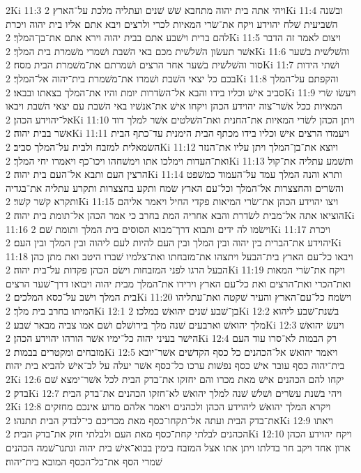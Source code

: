 2Ki 11:3  ויהי אתה בית יהוה מתחבא שׁשׁ שׁנים ועתליה מלכת על־הארץ׃
2Ki 11:4  ובשׁנה השׁביעית שׁלח יהוידע ויקח את־שׂרי המאיות לכרי ולרצים ויבא אתם אליו בית יהוה ויכרת להם ברית וישׁבע אתם בבית יהוה וירא אתם את־בן־המלך׃
2Ki 11:5  ויצום לאמר זה הדבר אשׁר תעשׂון השׁלשׁית מכם באי השׁבת ושׁמרי משׁמרת בית המלך׃
2Ki 11:6  והשׁלשׁית בשׁער סור והשׁלשׁית בשׁער אחר הרצים ושׁמרתם את־משׁמרת הבית מסח׃
2Ki 11:7  ושׁתי הידות בכם כל יצאי השׁבת ושׁמרו את־משׁמרת בית־יהוה אל־המלך׃
2Ki 11:8  והקפתם על־המלך סביב אישׁ וכליו בידו והבא אל־השׂדרות יומת והיו את־המלך בצאתו ובבאו׃
2Ki 11:9  ויעשׂו שׂרי המאיות ככל אשׁר־צוה יהוידע הכהן ויקחו אישׁ את־אנשׁיו באי השׁבת עם יצאי השׁבת ויבאו אל־יהוידע הכהן׃
2Ki 11:10  ויתן הכהן לשׂרי המאיות את־החנית ואת־השׁלטים אשׁר למלך דוד אשׁר בבית יהוה׃
2Ki 11:11  ויעמדו הרצים אישׁ וכליו בידו מכתף הבית הימנית עד־כתף הבית השׂמאלית למזבח ולבית על־המלך סביב׃
2Ki 11:12  ויוצא את־בן־המלך ויתן עליו את־הנזר ואת־העדות וימלכו אתו וימשׁחהו ויכו־כף ויאמרו יחי המלך׃
2Ki 11:13  ותשׁמע עתליה את־קול הרצין העם ותבא אל־העם בית יהוה׃
2Ki 11:14  ותרא והנה המלך עמד על־העמוד כמשׁפט והשׂרים והחצצרות אל־המלך וכל־עם הארץ שׂמח ותקע בחצצרות ותקרע עתליה את־בגדיה ותקרא קשׁר קשׁר׃
2Ki 11:15  ויצו יהוידע הכהן את־שׂרי המיאות פקדי החיל ויאמר אליהם הוציאו אתה אל־מבית לשׂדרת והבא אחריה המת בחרב כי אמר הכהן אל־תומת בית יהוה׃
2Ki 11:16  וישׂמו לה ידים ותבוא דרך־מבוא הסוסים בית המלך ותומת שׁם׃
2Ki 11:17  ויכרת יהוידע את־הברית בין יהוה ובין המלך ובין העם להיות לעם ליהוה ובין המלך ובין העם׃
2Ki 11:18  ויבאו כל־עם הארץ בית־הבעל ויתצהו את־מזבחתו ואת־צלמיו שׁברו היטב ואת מתן כהן הבעל הרגו לפני המזבחות וישׂם הכהן פקדות על־בית יהוה׃
2Ki 11:19  ויקח את־שׂרי המאות ואת־הכרי ואת־הרצים ואת כל־עם הארץ וירידו את־המלך מבית יהוה ויבואו דרך־שׁער הרצים בית המלך וישׁב על־כסא המלכים׃
2Ki 11:20  וישׂמח כל־עם־הארץ והעיר שׁקטה ואת־עתליהו המיתו בחרב בית מלך׃
2Ki 12:1  בן־שׁבע שׁנים יהואשׁ במלכו׃
2Ki 12:2  בשׁנת־שׁבע ליהוא מלך יהואשׁ וארבעים שׁנה מלך בירושׁלם ושׁם אמו צביה מבאר שׁבע׃
2Ki 12:3  ויעשׂ יהואשׁ הישׁר בעיני יהוה כל־ימיו אשׁר הורהו יהוידע הכהן׃
2Ki 12:4  רק הבמות לא־סרו עוד העם מזבחים ומקטרים בבמות׃
2Ki 12:5  ויאמר יהואשׁ אל־הכהנים כל כסף הקדשׁים אשׁר־יובא בית־יהוה כסף עובר אישׁ כסף נפשׁות ערכו כל־כסף אשׁר יעלה על לב־אישׁ להביא בית יהוה׃
2Ki 12:6  יקחו להם הכהנים אישׁ מאת מכרו והם יחזקו את־בדק הבית לכל אשׁר־ימצא שׁם בדק׃
2Ki 12:7  ויהי בשׁנת עשׂרים ושׁלשׁ שׁנה למלך יהואשׁ לא־חזקו הכהנים את־בדק הבית׃
2Ki 12:8  ויקרא המלך יהואשׁ ליהוידע הכהן ולכהנים ויאמר אלהם מדוע אינכם מחזקים את־בדק הבית ועתה אל־תקחו־כסף מאת מכריכם כי־לבדק הבית תתנהו׃
2Ki 12:9  ויאתו הכהנים לבלתי קחת־כסף מאת העם ולבלתי חזק את־בדק הבית׃
2Ki 12:10  ויקח יהוידע הכהן ארון אחד ויקב חר בדלתו ויתן אתו אצל המזבח בימין בבוא־אישׁ בית יהוה ונתנו־שׁמה הכהנים שׁמרי הסף את־כל־הכסף המובא בית־יהוה׃
